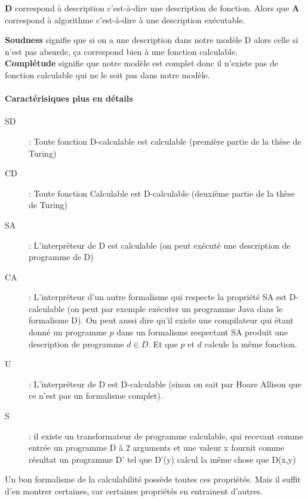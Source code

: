 \begin{myrem}
	\textbf{D} correspond à description c'est-à-dire une description de fonction.
	Alors que \textbf{A} correspond à algorithme c'est-à-dire à une description
	exécutable.
\end{myrem}

\begin{myrem}
	\textbf{Soudness} signifie que si on a une description dans notre modèle D alors
	celle si n'est pas absurde, ça correspond bien à une fonction
	calculable.\\
	\textbf{Complétude} signifie que notre modèle est complet donc il
	n'existe pas de fonction calculable qui ne le soit pas dans notre
	modèle.
\end{myrem}

\paragraph{Caractérisiques plus en détails}
\begin{description}
	\item[SD] : Toute fonction D-calculable est calculable (première partie 
		de la thèse de Turing)
	\item[CD] : Toute fonction Calculable est D-calculable (deuxième partie 
		de la thèse de Turing)
	\item[SA] : L'interpréteur de D est calculable (on peut exécuté une 
		description de programme de D)
	\item[CA] : L'interpréteur d'un autre formalisme qui respecte la 
		propriété SA est 
		D-calculable (on peut par exemple exécuter un programme Java 
		dans le formalisme D). On peut aussi dire qu'il existe une 
		compilateur qui étant donné un programme $p$ dans un formalisme 
		respectant SA produit une description de programme $d \in D$. 
		Et que $p$ et $d$ calcule la même fonction.
	\item[U] : L'interpréteur de D est D-calculable (sinon on sait par 
		Hoare Allison que ce n'est pas un formalisme complet).
	\item[S] : il existe un transformateur de programme calculable, qui 
		recevant comme entrée un programme D à 2 arguments et une valeur 
		x fournit comme résultat un programme D' tel que D'(y) calcul 
		la même chose que D(x,y)
\end{description}
Un bon formalisme de la calculabilité possède toutes ces propriétés. Mais il 
suffit d'en montrer certaines, car certaines propriétés en entrainent d'autres.

